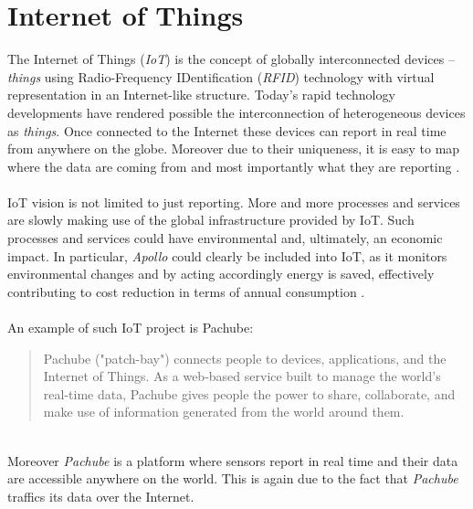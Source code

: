 \documentclass[12pt,a4paper]{report}
\begin{document}
\section{Internet of Things}
The Internet of Things (\textit{IoT}) is the concept of globally interconnected devices -- \textit{things} using Radio-Frequency IDentification (\textit{RFID}) technology with virtual representation in an Internet-like structure.
Today's rapid technology developments have rendered possible the interconnection of heterogeneous devices as \textit{things}.
Once connected to the Internet these devices can report in real time from anywhere on the globe.
Moreover due to their uniqueness, it is easy to map where the data are coming from and most importantly what they are reporting \cite{website:iot}.\\
\ \\
IoT vision is not limited to just reporting.
More and more processes and services are slowly making use of the global infrastructure provided by IoT.
Such processes and services could have environmental and, ultimately, an economic impact. 
In particular, \emph{Apollo} could clearly be included into IoT, as it monitors environmental changes and by acting accordingly energy is saved, effectively contributing to cost reduction in terms of annual consumption \cite{iotconference}.\\
\ \\
An example of such IoT project is Pachube:
\begin{quote} 
    Pachube ("patch-bay") connects people to devices, applications, and the Internet of Things. As a web-based service built to manage the world's real-time data, Pachube gives people the power to share, collaborate, and make use of information generated from the world around them. \cite{website:pachube}
\end{quote}
\ \\
Moreover \textit{Pachube} is a platform where sensors report in real time and their data are accessible anywhere on the world. 
This is again due to the fact that \textit{Pachube} traffics its data over the Internet.
%
\end{document}
